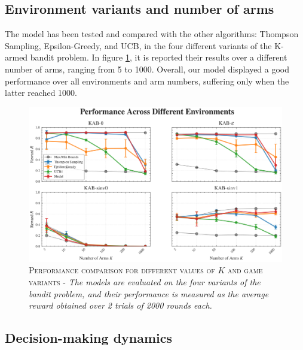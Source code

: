 \subsection{Environment variants and number of arms}

The model has been tested and compared with the other algorithms: Thompson Sampling, Epsilon-Greedy, and UCB, in the four different variants of the K-armed bandit problem.
In figure \ref{fig:perf_plot}, it is reported their results over a different number of arms, ranging from 5 to 1000.
Overall, our model displayed a good performance over all environments and arm numbers, suffering only when the latter reached 1000.

\begin{figure}[H]
    \centering
    \includegraphics[width=1.\textwidth]{figures/performance_plot.png}
    \caption{\textsc{Performance comparison for different values of $K$ and game variants} - \textit{The models are evaluated on the four variants of the bandit problem, and their performance is measured as the average reward obtained over 2 trials of 2000 rounds each.}}
    \label{fig:perf_plot}
\end{figure}


\subsection{Decision-making dynamics}


